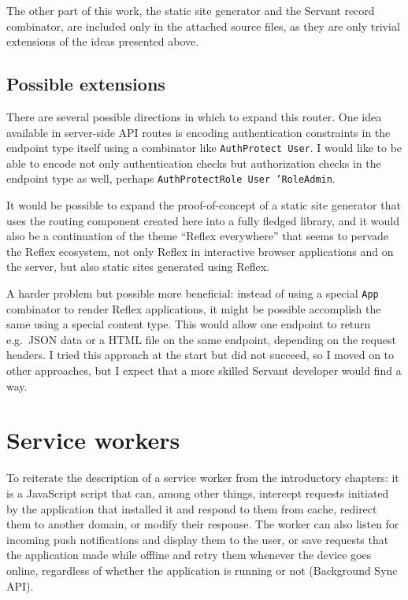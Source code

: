 \documentclass[english,zadani,odsaz]{fitthesis}
\begin{document}
The other part of this work, the static site generator and the Servant record
combinator, are included only in the attached source files, as they are only
trivial extensions of the ideas presented above.

\subsection{Possible extensions}
\label{sec:org53cc193}
There are several possible directions in which to expand this router. One idea
available in server-side API routes is encoding authentication constraints in
the endpoint type itself using a combinator like \texttt{AuthProtect User}. I would like
to be able to encode not only authentication checks but authorization checks in
the endpoint type as well, perhaps \texttt{AuthProtectRole User 'RoleAdmin}.

It would be possible to expand the proof-of-concept of a static site generator
that uses the routing component created here into a fully fledged library, and
it would also be a continuation of the theme ``Reflex everywhere'' that seems to
pervade the Reflex ecosystem, not only Reflex in interactive browser
applications and on the server, but also static sites generated using Reflex.

A harder problem but possible more beneficial: instead of using a special \texttt{App}
combinator to render Reflex applications, it might be possible accomplish the
same using a special content type. This would allow one endpoint to return
e.g.~JSON data or a HTML file on the same endpoint, depending on the request
headers. I tried this approach at the start but did not succeed, so I moved on
to other approaches, but I expect that a more skilled Servant developer would
find a way.

\section{Service workers}
\label{sec:org4af91cb}
To reiterate the description of a service worker from the introductory chapters:
it is a JavaScript script that can, among other things, intercept requests
initiated by the application that installed it and respond to them from cache,
redirect them to another domain, or modify their response. The worker can also
listen for incoming push notifications and display them to the user, or save
requests that the application made while offline and retry them whenever the
device goes online, regardless of whether the application is running or not
(Background Sync API).
\end{document}

